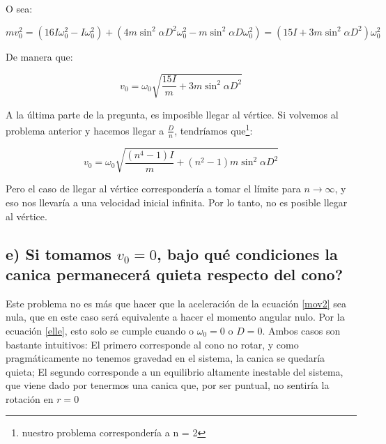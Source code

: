 \documentclass[a4paper,12pt]{article}
\begin{document}
O sea:

$$m v_0^2 = (16I \omega_{0}^2 - I\omega_0^2) + (4m\sin^2\alpha D^2\omega_0^2 - m\sin^2\alpha D\omega_0^2 ) = (15I + 3m\sin^2\alpha D^2)\omega_0^2 $$

De manera que:

\begin{equation}
  v_0 = \omega_0\sqrt{\frac{15I}{m} + 3m\sin^2\alpha D^2} 
\end{equation}

A la última parte de la pregunta, es imposible llegar al vértice.  Si volvemos al problema anterior y hacemos llegar a $\frac{D}{n}$, tendríamos que\footnote{nuestro problema correspondería a n = 2}:

$$v_{0} = \omega_0\sqrt{\frac{(n^4 - 1)I}{m} + (n^2-1)m\sin^2\alpha D^2}  $$

Pero el caso de llegar al vértice correspondería a tomar el límite para $n\to\infty$, y eso nos llevaría a una velocidad inicial infinita. Por lo tanto, no es posible llegar al vértice.

\subsection*{e) Si tomamos $v_0=0$, bajo qué condiciones la canica permanecerá quieta respecto del cono?}

Este problema no es más que hacer que la aceleración de la ecuación \eqref{mov2} sea nula, que en este caso será equivalente a hacer el momento angular nulo. Por la ecuación \eqref{elle}, esto solo se cumple cuando o $\omega_{0} = 0$ o $D = 0$. Ambos casos son bastante intuitivos: El primero corresponde al cono no rotar, y como pragmáticamente no tenemos gravedad en el sistema, la canica se quedaría quieta; El segundo corresponde a un equilibrio altamente inestable del sistema, que viene dado por tenermos una canica que, por ser puntual, no sentiría la rotación en $r=0$ 
\end{document}
